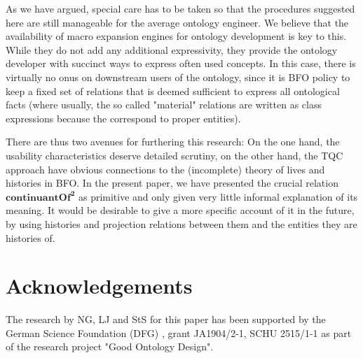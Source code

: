 \documentclass{ao2e}
\newcommand{\mirel}[1]{\ensuremath{\mathrm{\mathbf{#1}}}}
\newcommand{\mrel}[2]{\mirel{#1^#2}}
\newcommand{\mrelb}[1]{\mrel{#1}{2}}
\begin{document}
As we have argued, special care has to be taken so that the procedures suggested
here are still manageable for the average ontology engineer. We
believe that the availability of macro expansion engines for ontology
development is key to this. While they do not add any additional expressivity, they
provide the ontology developer with succinct ways to express often used
concepts. In this case, there is virtually no onus on downstream users of the
ontology, since it is BFO policy to keep a fixed set of relations that is deemed
sufficient to express all ontological facts (where usually, the so called
"material" relations are written as class expressions because the correspond to
proper entities). 

There are thus two avenues for furthering this research: On the one hand, the
usability characteristics deserve detailed scrutiny, on the other hand, the
TQC approach have obvious connections to the (incomplete) theory of lives and
histories in BFO.
In the present paper, we have presented the crucial
relation \mrelb{continuantOf} as primitive and only given very little informal
explanation of its meaning. It would be desirable to give a more specific account of it in the
future, by using histories and projection relations between them and the
entities they are histories of.
\section*{Acknowledgements}
The research by NG, LJ and StS for this paper has been supported by the German
Science Foundation (DFG) , grant
JA1904/2-1, SCHU 2515/1-1 as part of the research project "Good Ontology Design".
%
\printbibliography
\end{document}

